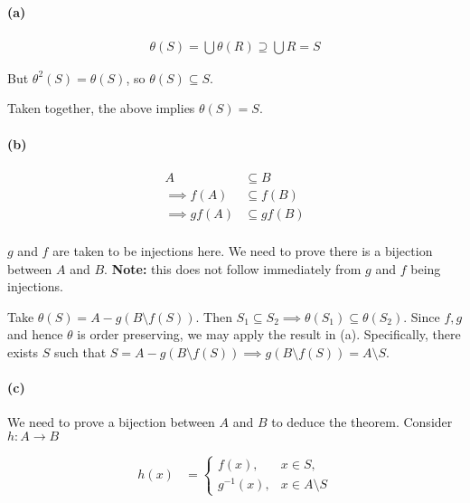 \documentclass{article}
\begin{document}
\paragraph{(a)}

\begin{align*}
  \theta(S) = \bigcup \theta(R) \supseteq \bigcup R = S
\end{align*}

But $\theta^2(S) = \theta(S)$, so $\theta(S) \subseteq S$.

Taken together, the above implies $\theta(S) = S$.

\paragraph{(b)}
\begin{align*}
  A &\subseteq B \\
  \implies f\left(A\right) &\subseteq f\left(B\right) \\
  \implies gf\left(A\right) &\subseteq gf\left(B\right) \\
\end{align*}

$g$ and $f$ are taken to be injections here. We need to prove there is a bijection between $A$ and $B$. \textbf{Note:} this does not follow immediately from $g$
and $f$ being injections.

Take $\theta(S) = A - g\left(B \setminus f\left(S\right)\right)$. Then $S_1 \subseteq S_2 \implies \theta(S_1) \subseteq \theta(S_2)$. Since $f, g$ and hence $\theta$ is order preserving, we may apply the result in (a). Specifically, there exists $S$ such that $S = A - g\left(B \setminus f\left(S\right)\right) \implies g\left(B \setminus f\left(S\right)\right) = A \setminus S$.

\paragraph{(c)}

We need to prove a bijection between $A$ and $B$ to deduce the theorem. Consider $h\colon A \rightarrow B$

\begin{align*}
  h(x) &= \begin{cases}
    f(x), & x \in S,  \\
    g^{-1}(x), & x \in A \setminus S
  \end{cases} \\
\end{align*}
\end{document}

